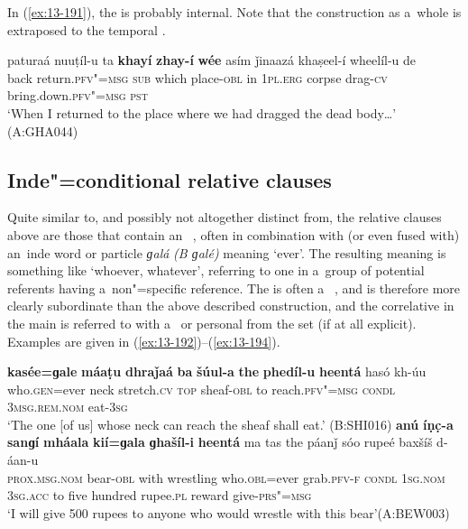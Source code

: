 In (\ref{ex:13-191}), the  is probably internal. Note that the construction as a~whole is extraposed to the temporal .

\begin{exe}
\ex
\label{ex:13-191}
\gll paturaá nuuṭíl-u ta \textbf{khayí} \textbf{zhay-í} \textbf{wée} asím  ǰinaazá khaṣeel-í wheelíl-u de \\
back return.\textsc{pfv"=msg} \textsc{sub} which place-\textsc{obl} in \textsc{1pl.erg} corpse drag-\textsc{cv}  bring.down.\textsc{pfv"=msg} \textsc{pst}   \\
\glt `When I returned to the place where we had dragged the dead body{\ldots}' (A:GHA044)
\end{exe}

\subsection{Inde"=conditional relative clauses}
\label{subsec:13-6-2}

Quite similar to, and possibly not altogether distinct from, the relative clauses above are those that contain an~ , often in combination with (or even fused with) an~inde word or particle \textit{ɡalá} \textit{(B ɡalé)} meaning `ever'. The resulting meaning is something like `whoever, whatever', referring to one in a~group of potential referents having a~non"=specific reference. The  is often a~ , and is therefore more clearly subordinate than the above described construction, and the correlative in the main  is referred to with a~ or personal  from the  set (if at all explicit). Examples are given in (\ref{ex:13-192})--(\ref{ex:13-194}).
\largerpage

\ea
\label{ex:13-192}
\gll \textbf{kasée=ɡale} \textbf{máaṭu} \textbf{dhraǰaá} \textbf{ba} \textbf{šúul-a} \textbf{the} \textbf{phedíl-u} \textbf{heentá} hasó kh-úu\\
who.\textsc{gen}=ever neck stretch.\textsc{cv} \textsc{top} sheaf-\textsc{obl} to  reach.\textsc{pfv"=msg} \textsc{condl} \textsc{3msg.rem.nom} eat-\textsc{3sg}\\
\glt `The one [of us] whose neck can reach the sheaf shall eat.' (B:SHI016)
\ex
\label{ex:13-193}
\gll \textbf{anú} \textbf{íṇc̣-a} \textbf{sanɡí} \textbf{mháala} \textbf{kií=ɡala} \textbf{ɡhašíl-i}  \textbf{heentá} ma tas the páanǰ sóo rupeé baxšíš d-áan-u\\
\textsc{prox.msg.nom}{\protect\footnotemark} bear-\textsc{obl} with wrestling who.\textsc{obl}=ever grab.\textsc{pfv-f} \textsc{condl} \textsc{1sg.nom} \textsc{3sg.acc} to five hundred rupee.\textsc{pl} reward give-\textsc{prs"=msg}\\
\glt `I will give 500 rupees to anyone who would wrestle with this bear'\newline (A:BEW003)

